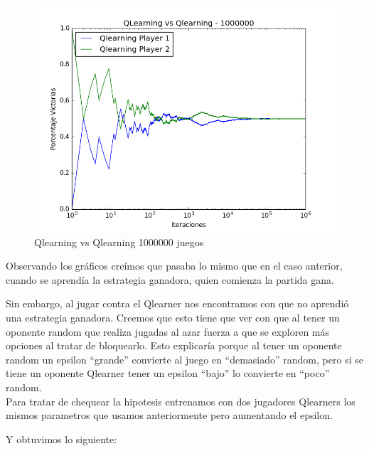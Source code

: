 \begin{figure}[h]
 \centering
 \begin{minipage}{.45\textwidth}
	\centering
	\includegraphics[scale=0.35]{img1/QlearningVsQlearning_1000000_6x5_merge.png}
        \caption{Qlearning vs Qlearning 1000000 juegos}
  \end{minipage}
\end{figure}

Observando los gráficos creímos que pasaba lo mismo que en el caso anterior, cuando se aprendía la estrategia ganadora, quien comienza la partida gana. 

Sin embargo, al jugar contra el Qlearner nos encontramos con que no aprendió una estrategia ganadora. Creemos que esto tiene que ver con que al tener un oponente random que realiza jugadas al azar fuerza a que se exploren más opciones al tratar de bloquearlo.  Esto explicaría porque al tener un oponente random un epsilon ``grande'' convierte al juego en ``demasiado'' random, pero si se tiene un oponente Qlearner tener un epsilon ``bajo'' lo convierte en ``poco'' random. \\

Para tratar de chequear la hipotesis entrenamos con dos jugadores Qlearners los mismos parametros que usamos anteriormente pero aumentando el epsilon. 

Y obtuvimos lo siguiente:

